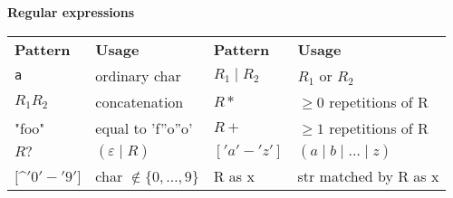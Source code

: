 \textbf{Regular expressions}
\begin{center}
	\begin{tabular}{l l l l}
		\textbf{Pattern}      & \textbf{Usage}                & \textbf{Pattern}  & \textbf{Usage}  \\
		\texttt{\textquotesingle a \textquotesingle}                   & ordinary char                 & $R_1 \mid R_2$    & $R_1$ or $R_2$      \\
		$R_1R_2$              & concatenation                 & $R*$              & $\geq 0$  repetitions of R \\
		"foo"                 & equal to 'f''o''o'            & $R+$              & $\geq 1$  repetitions of R \\
		$R?$                  & $(\varepsilon \mid R)$        & $['a'-'z']$       & $(a \mid b \mid \dots \mid z)$ \\
		$[$\textbf{\textasciicircum}$'0'-'9']$          & char $\notin \{0, \dots, 9\}$ & R as x            & str matched by R as x \\
	\end{tabular}
\end{center}
